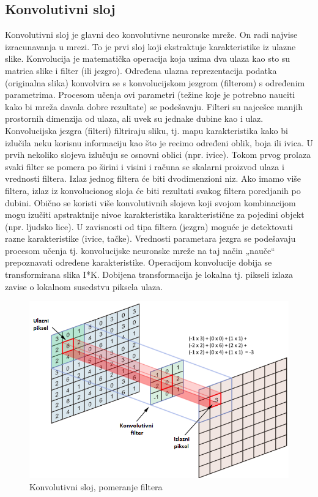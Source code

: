 \documentclass[a4paper]{article}
\begin{document}
\subsection{Konvolutivni sloj}

Konvolutivni sloj je glavni deo konvolutivne neuronske mreže. On radi najvise izracunavanja u mrezi. To je prvi sloj koji ekstraktuje karakteristike iz ulazne slike. Konvolucija je matematička operacija koja uzima dva ulaza kao sto su matrica slike i filter (ili jezgro). Određena ulazna reprezentacija podatka (originalna slika) konvolvira se s konvolucijskom jezgrom (filterom) s određenim parametrima. Procesom učenja ovi parametri (težine koje je potrebno nauciti kako bi mreža davala dobre rezultate) se podešavaju. Filteri su najcešce manjih prostornih dimenzija od ulaza, ali uvek su jednake dubine kao i ulaz. Konvolucijska jezgra (filteri) filtriraju sliku, tj. mapu karakteristika kako bi izlučila neku korisnu informaciju kao što je recimo određeni oblik, boja ili ivica. U prvih nekoliko slojeva izlučuju se osnovni oblici (npr. ivice). Tokom prvog prolaza svaki filter se pomera po širini i visini i računa se skalarni proizvod ulaza i vrednosti filtera. Izlaz jednog filtera će biti dvodimenzioni niz. Ako imamo više filtera, izlaz iz konvolucionog sloja će biti rezultati svakog filtera poredjanih po dubini. Obično se koristi više konvolutivnih slojeva koji svojom kombinacijom mogu izučiti apstraktnije nivoe karakteristika karakteristične za pojedini objekt (npr. ljudsko lice). U zavisnosti od tipa filtera (jezgra) moguće je detektovati razne karakteristike (ivice, tačke). Vrednosti parametara jezgra se podešavaju procesom učenja tj. konvolucijske neuronske mreže na taj način „nauče“ prepoznavati određene karakteristike. Operacijom konvolucije dobija se transformirana slika I*K. Dobijena transformacija je lokalna tj. pikseli izlaza zavise o lokalnom susedstvu piksela ulaza.

\begin{figure}[h!]
\begin{center}
\includegraphics[scale=0.9]{convolution.png}
\end{center}
\caption{Konvolutivni sloj, pomeranje filtera}
\label{fig:convolution}
\end{figure}
\end{document}
